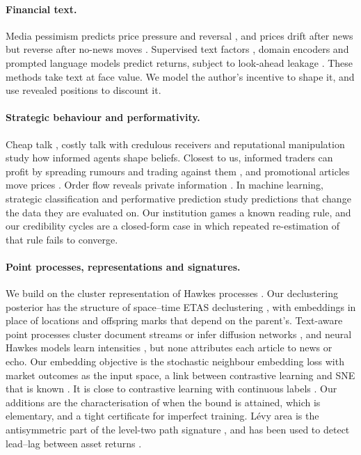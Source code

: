 \documentclass{article}
\theoremstyle{plain}
\theoremstyle{definition}
\theoremstyle{remark}
\begin{document}
\paragraph{Financial text.} Media pessimism predicts price pressure and reversal \citep{tetlock2007}, and prices drift after news but reverse after no-news moves \citep{chan2003}. Supervised text factors \citep{ke2019}, domain encoders \citep{araci2019} and prompted language models \citep{lopezlira2023} predict returns, subject to look-ahead leakage \citep{glasserman2023}. These methods take text at face value. We model the author's incentive to shape it, and use revealed positions to discount it.

\paragraph{Strategic behaviour and performativity.} Cheap talk \citep{crawford1982}, costly talk with credulous receivers \citep{kartik2007} and reputational manipulation \citep{benabou1992} study how informed agents shape beliefs. Closest to us, informed traders can profit by spreading rumours and trading against them \citep{vanbommel2003}, and promotional articles move prices \citep{kogan2023}. Order flow reveals private information \citep{kyle1985}. In machine learning, strategic classification \citep{hardt2016} and performative prediction \citep{perdomo2020} study predictions that change the data they are evaluated on. Our institution games a known reading rule, and our credibility cycles are a closed-form case in which repeated re-estimation of that rule fails to converge.

\paragraph{Point processes, representations and signatures.} We build on the cluster representation of Hawkes processes \citep{hawkes1971,hawkesoakes1974}. Our declustering posterior has the structure of space--time ETAS declustering \citep{zhuang2002}, with embeddings in place of locations and offspring marks that depend on the parent's. Text-aware point processes cluster document streams or infer diffusion networks \citep{du2015,he2015}, and neural Hawkes models learn intensities \citep{mei2017}, but none attributes each article to news or echo. Our embedding objective is the stochastic neighbour embedding loss \citep{hinton2002} with market outcomes as the input space, a link between contrastive learning and SNE that is known \citep{hu2023,damrich2023}. It is close to contrastive learning with continuous labels \citep{oord2018,khosla2020,dufumier2021,zha2023}. Our additions are the characterisation of when the bound is attained, which is elementary, and a tight certificate for imperfect training. L\'evy area is the antisymmetric part of the level-two path signature \citep{lyons1998,chevyrev2016,kidger2019}, and has been used to detect lead--lag between asset returns \citep{bennett2022}.
\end{document}
